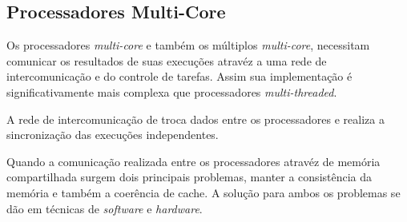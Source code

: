 \subsection{Processadores Multi-Core}

Os processadores \textit{multi-core} e também os múltiplos
\textit{multi-core}, necessitam comunicar os resultados de suas execuções
atravéz a uma rede de intercomunicação e do controle de tarefas.
Assim sua implementação é significativamente mais complexa que processadores
\textit{multi-threaded}.

A rede de intercomunicação de troca dados entre os processadores e realiza a
sincronização das execuções independentes.

Quando a comunicação realizada entre os processadores atravéz de memória
compartilhada surgem dois principais problemas, manter a consistência da memória
e também a coerência de cache.
A solução para ambos os problemas se dão em técnicas de \textit{software} e
\textit{hardware}.
